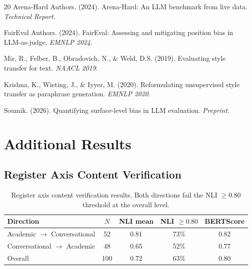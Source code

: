 \documentclass[11pt,a4paper]{article}
\begin{document}
\begin{thebibliography}{20}
{Arena-Hard Authors}. (2024).
\newblock Arena-Hard: An LLM benchmark from live data.
\newblock \textit{Technical Report}.

{FairEval Authors}. (2024).
\newblock FairEval: Assessing and mitigating position bias in LLM-as-judge.
\newblock \textit{EMNLP 2024}.

Mir, R., Felber, B., Obradovich, N., \& Weld, D.S. (2019).
\newblock Evaluating style transfer for text.
\newblock \textit{NAACL 2019}.

Krishna, K., Wieting, J., \& Iyyer, M. (2020).
\newblock Reformulating unsupervised style transfer as paraphrase generation.
\newblock \textit{EMNLP 2020}.

{Soumik}. (2026).
\newblock Quantifying surface-level bias in LLM evaluation.
\newblock \textit{Preprint}.

\end{thebibliography}

\appendix
\section{Additional Results}

\subsection{Register Axis Content Verification}
\label{app:register}

\begin{table}[h]
\centering
\small
\caption{Register axis content verification results. Both directions fail the NLI $\geq 0.80$ threshold at the overall level.}
\label{tab:register}
\begin{tabular}{lcccc}
\toprule
\textbf{Direction} & \textbf{$N$} & \textbf{NLI mean} & \textbf{NLI $\geq 0.80$} & \textbf{BERTScore} \\
\midrule
Academic $\to$ Conversational & 52 & 0.81 & 73\% & 0.82 \\
Conversational $\to$ Academic & 48 & 0.65 & 52\% & 0.77 \\
Overall & 100 & 0.72 & 63\% & 0.80 \\
\bottomrule
\end{tabular}
\end{table}
\end{document}
